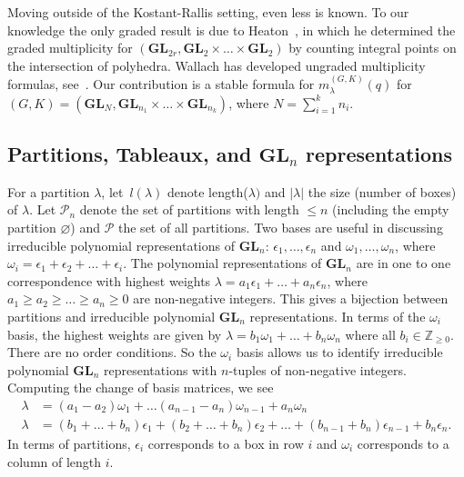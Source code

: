 \documentclass[ALCO,Unicode]{cedram}
\newcommand{\Z}{\mathbb{Z}}
\newcommand{\GL}{\textbf{GL}}
\newcommand{\Par}{\mathcal{P}}
\begin{document}
Moving outside of the Kostant-Rallis setting, even less is known. To our knowledge the only graded result is due to Heaton~\cite{heaton2023graded}, in which he determined the graded multiplicity for $(\GL_{2r}, \GL_2 \times \dots \times \GL_2)$ by counting integral points on the intersection of polyhedra. Wallach has developed ungraded multiplicity formulas, see~\cite{Wallach2017, Wallach2017-2}. Our contribution is a stable formula for $m_\lambda^{(G, K)}(q)$ for $(G,K) = (\GL_N, \GL_{n_1} \times \dots \times \GL_{n_k})$, where $N = \sum_{i=1}^k n_i$.


\subsection{Partitions, Tableaux, and \texorpdfstring{\normalfont $\GL_n$}{GLn} representations }

For a partition $\lambda$, let~$l(\lambda)$ denote length($\lambda)$ and $|\lambda|$ the size (number of boxes) of $\lambda$. Let $\Par_n$ denote the set of partitions with length $\leq n$ (including the empty partition $\varnothing$) and $\Par$ the set of all partitions. Two bases are useful in discussing irreducible polynomial representations of $\GL_n$: $\epsilon_1, \dots , \epsilon_n$  and $\omega_1, \dots , \omega_n$, where $\omega_i = \epsilon_1 + \epsilon_2 + \dots + \epsilon_i$. The polynomial representations of $\GL_n$ are in one to one correspondence with highest weights $\lambda = a_1\epsilon_1 + \dots + a_n \epsilon_n$, where $a_1 \geq a_2 \geq \dots \geq a_n \geq 0$ are non-negative integers. This gives a bijection between partitions and irreducible polynomial $\GL_n$ representations. In terms of the $\omega_i$ basis, the highest weights are given by $\lambda = b_1 \omega_1 + \dots + b_n \omega_n$ where all $b_i \in \Z_{\geq 0}$. There are no order conditions. So the $\omega_i$ basis allows us to identify irreducible polynomial $\GL_n$ representations with $n$-tuples of non-negative integers. Computing the change of basis matrices, we see
\begin{align*}
\lambda &= (a_1 - a_2)\omega_1 + \dots (a_{n-1} - a_n)\omega_{n-1} + a_n \omega_n\\
\lambda &= (b_1 + \dots + b_n) \epsilon_1 + (b_2 + \dots + b_n) \epsilon_2 + \dots + (b_{n-1} + b_n)\epsilon_{n-1} + b_n \epsilon_n.
\end{align*}
In terms of partitions, $\epsilon_i$ corresponds to a box in row $i$ and $\omega_i$ corresponds to a column of length $i$.
\end{document}
